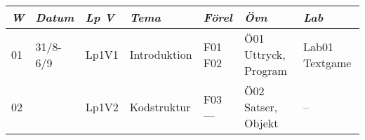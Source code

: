 \begin{tabular}{l|l|l|l|l|l|l}
\textit{W} & \textit{Datum} & \textit{Lp V} & \textit{Tema} & \textit{Förel} & \textit{Övn} & \textit{Lab} \\ \hline \hline
01 & 31/8-6/9 & Lp1V1 & Introduktion & F01 F02 & Ö01 Uttryck, Program & Lab01 Textgame \\
02 &          & Lp1V2 & Kodstruktur  & F03 --- & Ö02 Satser, Objekt   & --             \\
\end{tabular}
